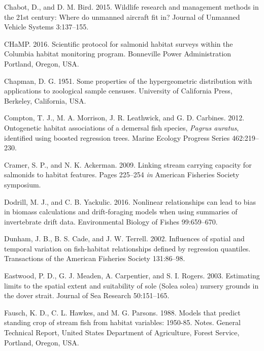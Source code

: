 \documentclass[
  12pt,
]{article}
\begin{document}
\leavevmode\hypertarget{ref-Chabot2015}{}%
Chabot, D., and D. M. Bird. 2015. Wildlife research and management methods in the 21st century: Where do unmanned aircraft fit in? Journal of Unmanned Vehicle Systems 3:137--155.

\leavevmode\hypertarget{ref-CHaMP2016}{}%
CHaMP. 2016. Scientific protocol for salmonid habitat surveys within the Columbia habitat monitoring program. Bonneville Power Administration Portland, Oregon, USA.

\leavevmode\hypertarget{ref-Chapman1951}{}%
Chapman, D. G. 1951. Some properties of the hypergeometric distribution with applications to zoological sample censuses. University of California Press, Berkeley, California, USA.

\leavevmode\hypertarget{ref-Compton2012}{}%
Compton, T. J., M. A. Morrison, J. R. Leathwick, and G. D. Carbines. 2012. Ontogenetic habitat associations of a demersal fish species, \emph{Pagrus auratus}, identified using boosted regression trees. Marine Ecology Progress Series 462:219--230.

\leavevmode\hypertarget{ref-Cramer2009}{}%
Cramer, S. P., and N. K. Ackerman. 2009. Linking stream carrying capacity for salmonids to habitat features. Pages 225--254 \emph{in} American Fisheries Society symposium.

\leavevmode\hypertarget{ref-Dodrill2016}{}%
Dodrill, M. J., and C. B. Yackulic. 2016. Nonlinear relationships can lead to bias in biomass calculations and drift-foraging models when using summaries of invertebrate drift data. Environmental Biology of Fishes 99:659--670.

\leavevmode\hypertarget{ref-Dunham2002}{}%
Dunham, J. B., B. S. Cade, and J. W. Terrell. 2002. Influences of spatial and temporal variation on fish-habitat relationships defined by regression quantiles. Transactions of the American Fisheries Society 131:86--98.

\leavevmode\hypertarget{ref-Eastwood2003}{}%
Eastwood, P. D., G. J. Meaden, A. Carpentier, and S. I. Rogers. 2003. Estimating limits to the spatial extent and suitability of sole (Solea solea) nursery grounds in the dover strait. Journal of Sea Research 50:151--165.

\leavevmode\hypertarget{ref-Fausch1988}{}%
Fausch, K. D., C. L. Hawkes, and M. G. Parsons. 1988. Models that predict standing crop of stream fish from habitat variables: 1950-85. Notes. General Technical Report, United States Department of Agriculture, Forest Service, Portland, Oregon, USA.
\end{document}
